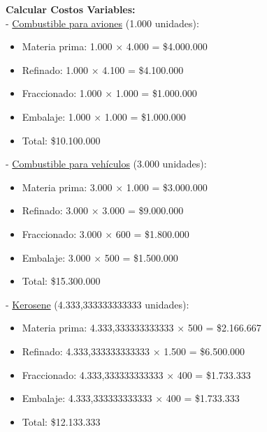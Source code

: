 \documentclass[10pt,a4paper]{article}
\begin{document}
\begin{enumerate}
     \textbf{Calcular Costos Variables:} \\

    - \underline{Combustible para aviones} (1.000 unidades):

    \begin{itemize}

        \item Materia prima: 1.000 × 4.000 = \$4.000.000
        \item Refinado: 1.000 × 4.100 = \$4.100.000
        \item Fraccionado: 1.000 × 1.000 = \$1.000.000
        \item Embalaje: 1.000 × 1.000 = \$1.000.000 \\
        \item Total: \$10.100.000

    \end{itemize}

    - \underline{Combustible para vehículos} (3.000 unidades):

    \begin{itemize}

        \item Materia prima: 3.000 × 1.000 = \$3.000.000
        \item Refinado: 3.000 × 3.000 = \$9.000.000
        \item Fraccionado: 3.000 × 600 = \$1.800.000
        \item Embalaje: 3.000 × 500 = \$1.500.000 \\
        \item Total: \$15.300.000

    \end{itemize}

    - \underline{Kerosene} (4.333,333333333333 unidades):

    \begin{itemize}

        \item Materia prima: 4.333,333333333333 × 500 = \$2.166.667
        \item Refinado: 4.333,333333333333 × 1.500 = \$6.500.000
        \item Fraccionado: 4.333,333333333333 × 400 = \$1.733.333
        \item Embalaje: 4.333,333333333333 × 400 = \$1.733.333 \\
        \item Total: \$12.133.333\\


\end{itemize}
\end{enumerate}
\end{document}
